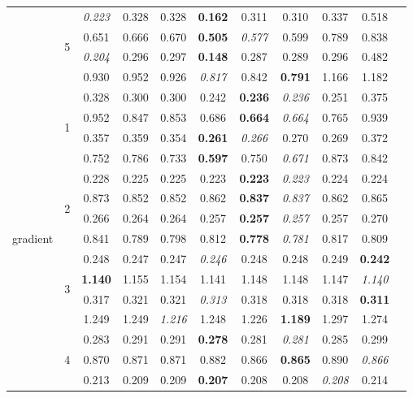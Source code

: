 \documentclass[authoryear, review, 11pt]{elsarticle}
\begin{document}
\begin{table}
\begin{center}
{\begin{tabular}{ccccccccccc}
  \cline{3-10}
   & \multirow{4}{*}{5} & \emph{0.223} & 0.328 & 0.328 & \textbf{0.162} & 0.311 & 0.310 & 0.337 & 0.518 \\ 
   &  & 0.651 & 0.666 & 0.670 & \textbf{0.505} & \emph{0.577} & 0.599 & 0.789 & 0.838 \\ 
   &  & \emph{0.204} & 0.296 & 0.297 & \textbf{0.148} & 0.287 & 0.289 & 0.296 & 0.482 \\ 
   &  & 0.930 & 0.952 & 0.926 & \emph{0.817} & 0.842 & \textbf{0.791} & 1.166 & 1.182 \\ 
  \hline
  \multirow{20}{*}{gradient} & \multirow{4}{*}{1} & 0.328 & 0.300 & 0.300 & 0.242 & \textbf{0.236} & \emph{0.236} & 0.251 & 0.375 \\ 
   &  & 0.952 & 0.847 & 0.853 & 0.686 & \textbf{0.664} & \emph{0.664} & 0.765 & 0.939 \\ 
   &  & 0.357 & 0.359 & 0.354 & \textbf{0.261} & \emph{0.266} & 0.270 & 0.269 & 0.372 \\ 
   &  & 0.752 & 0.786 & 0.733 & \textbf{0.597} & 0.750 & \emph{0.671} & 0.873 & 0.842 \\ 
  \cline{3-10}
   & \multirow{4}{*}{2} & 0.228 & 0.225 & 0.225 & 0.223 & \textbf{0.223} & \emph{0.223} & 0.224 & 0.224 \\ 
   &  & 0.873 & 0.852 & 0.852 & 0.862 & \textbf{0.837} & \emph{0.837} & 0.862 & 0.865 \\ 
   &  & 0.266 & 0.264 & 0.264 & 0.257 & \textbf{0.257} & \emph{0.257} & 0.257 & 0.270 \\ 
   &  & 0.841 & 0.789 & 0.798 & 0.812 & \textbf{0.778} & \emph{0.781} & 0.817 & 0.809 \\ 
  \cline{3-10}
   & \multirow{4}{*}{3} & 0.248 & 0.247 & 0.247 & \emph{0.246} & 0.248 & 0.248 & 0.249 & \textbf{0.242} \\ 
   &  & \textbf{1.140} & 1.155 & 1.154 & 1.141 & 1.148 & 1.148 & 1.147 & \emph{1.140} \\ 
   &  & 0.317 & 0.321 & 0.321 & \emph{0.313} & 0.318 & 0.318 & 0.318 & \textbf{0.311} \\ 
   &  & 1.249 & 1.249 & \emph{1.216} & 1.248 & 1.226 & \textbf{1.189} & 1.297 & 1.274 \\ 
  \cline{3-10}
   & \multirow{4}{*}{4} & 0.283 & 0.291 & 0.291 & \textbf{0.278} & 0.281 & \emph{0.281} & 0.285 & 0.299 \\ 
   &  & 0.870 & 0.871 & 0.871 & 0.882 & 0.866 & \textbf{0.865} & 0.890 & \emph{0.866} \\ 
   &  & 0.213 & 0.209 & 0.209 & \textbf{0.207} & 0.208 & 0.208 & \emph{0.208} & 0.214 \\ 

\end{tabular}}
\end{center}
\end{table}
\end{document}

